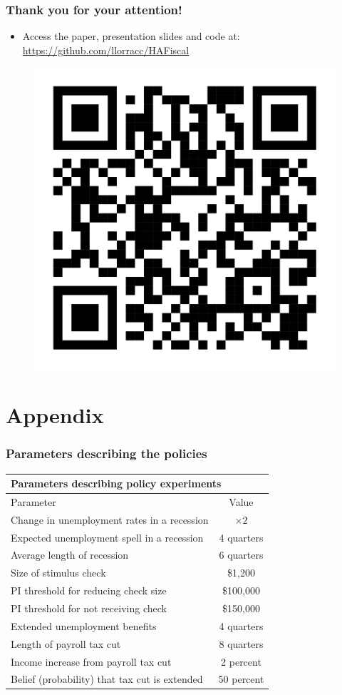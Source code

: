 \documentclass[pdflatex,aspectratio=169]{beamer}
\begin{document}
\begin{frame}
	\frametitle{Thank you for your attention!}
	\begin{itemize}[<+->] 
		\item Access the paper, presentation slides and code at: \href{https://github.com/llorracc/HAFiscal}{https://github.com/llorracc/HAFiscal}
	\end{itemize}	

		\begin{figure}
			\centering
			\includegraphics[width=0.3\linewidth]{"Presentations/QRCode.png"}
		\end{figure}
	
\end{frame}






\section{Appendix}


\begin{frame}
	\frametitle{Parameters describing the policies}
	\label{sli:policies}
	\centering 
	\begin{tabular}{lc}
		\toprule 
		\multicolumn{2}{l}{Parameters describing policy experiments} \\ \midrule 
		Parameter & Value \\ \midrule 
		Change in unemployment rates in a recession & $\times 2$ \\ 
		Expected unemployment spell in a recession & 4 quarters \\ 
		Average length of recession & 6 quarters \\ 
		Size of stimulus check & \$1,200 \\ 
		PI threshold for reducing check size & \$100,000 \\ 
		PI threshold for not receiving check & \$150,000 \\ 
		Extended unemployment benefits & 4 quarters \\
		Length of payroll tax cut & 8 quarters \\ 
		Income increase from payroll tax cut & 2 percent \\ 
		Belief (probability) that tax cut is extended & 50 percent 		
		\\ \bottomrule
	\end{tabular}

	\vspace{1cm}
	\hyperlink{Parameters}{} 
\end{frame}
\end{document}
